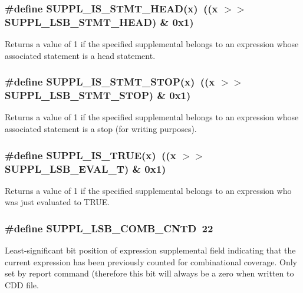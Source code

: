 \subsubsection{\setlength{\rightskip}{0pt plus 5cm}\#define SUPPL\_\-IS\_\-STMT\_\-HEAD(x)\ ((x $>$$>$ SUPPL\_\-LSB\_\-STMT\_\-HEAD) \& 0x1)}\label{group__expr__suppl_a23}


Returns a value of 1 if the specified supplemental belongs to an expression whose associated statement is a head statement. 
\subsubsection{\setlength{\rightskip}{0pt plus 5cm}\#define SUPPL\_\-IS\_\-STMT\_\-STOP(x)\ ((x $>$$>$ SUPPL\_\-LSB\_\-STMT\_\-STOP) \& 0x1)}\label{group__expr__suppl_a24}


Returns a value of 1 if the specified supplemental belongs to an expression whose associated statement is a stop (for writing purposes). 
\subsubsection{\setlength{\rightskip}{0pt plus 5cm}\#define SUPPL\_\-IS\_\-TRUE(x)\ ((x $>$$>$ SUPPL\_\-LSB\_\-EVAL\_\-T) \& 0x1)}\label{group__expr__suppl_a26}


Returns a value of 1 if the specified supplemental belongs to an expression who was just evaluated to TRUE. 
\subsubsection{\setlength{\rightskip}{0pt plus 5cm}\#define SUPPL\_\-LSB\_\-COMB\_\-CNTD\ 22}\label{group__expr__suppl_a17}


Least-significant bit position of expression supplemental field indicating that the current expression has been previously counted for combinational coverage. Only set by report command (therefore this bit will always be a zero when written to CDD file. 
